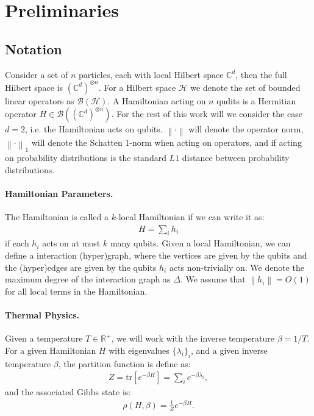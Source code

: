 \documentclass[a4paper,onecolumn,11pt,accepted=2017-05-09]{quantumarticle}
\newcommand{\norm}[1]{\left\lVert#1\right\rVert}
\newcommand{\ox}{\otimes}
\begin{document}
\section{Preliminaries} \label{Sec:Preliminaries}

\subsection{Notation}
Consider a set of $n$ particles, each with local Hilbert space $\mathbb{C}^d$, then the full Hilbert space is $(\mathbb{C}^d)^{\ox n}$.
For a Hilbert space $\mathcal{H}$ we denote the set of bounded linear operators as $\mathcal{B}(\mathcal{H})$.
A Hamiltonian acting on $n$ qudits is a Hermitian operator $H\in \mathcal{B}((\mathbb{C}^d)^{\ox n})$.
For the rest of this work will we consider the case $d=2$, i.e. the Hamiltonian acts on qubits.
$\norm{\cdot}$ will denote the operator norm, $\norm{\cdot}_1$ will denote the Schatten 1-norm when acting on operators, and if acting on probability distributions is the standard $L1$ distance between probability distributions.



\paragraph{Hamiltonian Parameters.} The Hamiltonian is called a $k$-local Hamiltonian if we can write it as:
\begin{align*}
    H = \sum_i h_i
\end{align*}
if each $h_i$ acts on at most $k$ many qubits.
Given a local Hamiltonian, we can define a interaction (hyper)graph, where the vertices are given by the qubits and the (hyper)edges are given by the qubits $h_i$ acts non-trivially on.
We denote the maximum degree of the interaction graph as $\Delta$.
We assume that $\norm{h_i}=O(1)$ for all local terms in the Hamiltonian.

\paragraph{Thermal Physics.}

Given a temperature $T\in \mathbb{R}^+$, we will work with the inverse temperature $\beta = 1/T$.
	For a given Hamiltonian $H$ with eigenvalues $\{\lambda_i\}_i$, and a given inverse temperature $\beta$, the partition function is define as:
	\begin{align*}
		Z = \text{tr}\left[ e^{-\beta H} \right] 
		= \sum_i e^{-\beta \lambda_i},
	\end{align*}
	and the associated Gibbs state is:
	\begin{align*}
		\rho(H,\beta) = \frac{1}{Z}e^{-\beta H}.
	\end{align*}
 
\end{document}
